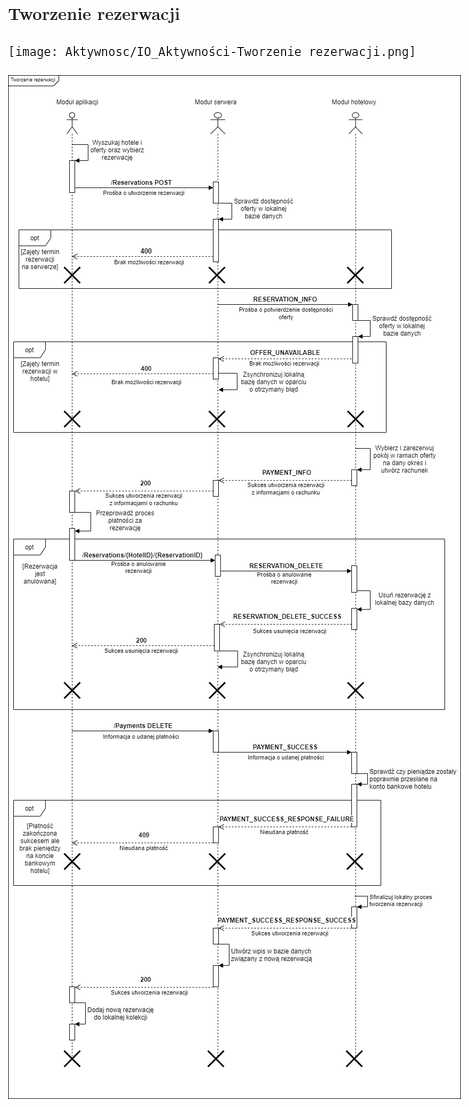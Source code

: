 \documentclass{article}
\begin{document}
\subsubsection{Tworzenie rezerwacji} \label{reservation_diagram}
\begin{center}
    \texttt{[image: Aktywnosc/IO\_Aktywności-Tworzenie rezerwacji.png]}
\end{center}
\begin{center}
    \includegraphics[scale=0.3]{Sekwencje/Reservation_Create.png}
\end{center}
\end{document}
